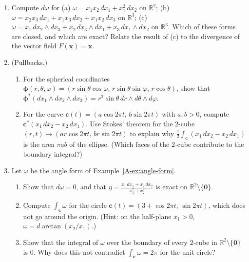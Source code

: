 \begin{enumerate}[leftmargin=*]
\begin{enumerate}[label=(\alph*)]
        \item Write down a basis of $\Lambda^2(\mathbb{R}^4)^*$.
        \item Show that $\varphi \wedge \varphi = 0$ for every $1$-form $\varphi$, but that $\omega = dx_1 \wedge dx_2 + dx_3 \wedge dx_4$ satisfies $\omega \wedge \omega = 2\, dx_1 \wedge dx_2 \wedge dx_3 \wedge dx_4 \neq 0$.
    \end{enumerate}
    \item Compute $d\omega$ for (a) $\omega = x_1x_2\, dx_1 + x_1^2\, dx_2$ on $\mathbb{R}^2$; (b) $\omega = x_2x_3\, dx_1 + x_1x_3\, dx_2 + x_1x_2\, dx_3$ on $\mathbb{R}^3$; (c) $\omega = x_1\, dx_2 \wedge dx_3 + x_2\, dx_3 \wedge dx_1 + x_3\, dx_1 \wedge dx_2$ on $\mathbb{R}^3$. Which of these forms are closed, and which are exact? Relate the result of (c) to the divergence of the vector field $F(\mathbf{x}) = \mathbf{x}$.
    \item (Pullbacks.)
    \begin{enumerate}[label=(\alph*)]
        \item For the spherical coordinates $\boldsymbol{\phi}(r, \theta, \varphi) = (r\sin\theta\cos\varphi, \, r\sin\theta\sin\varphi, \, r\cos\theta)$, show that $\boldsymbol{\phi}^*(dx_1 \wedge dx_2 \wedge dx_3) = r^2\sin\theta\, dr \wedge d\theta \wedge d\varphi$.
        \item For the curve $\mathbf{c}(t) = (a\cos 2\pi t, \, b\sin 2\pi t)$ with $a, b > 0$, compute $\mathbf{c}^*(x_1\, dx_2 - x_2\, dx_1)$. Use Stokes' theorem for the $2$-cube $(r, t) \mapsto (ar\cos 2\pi t, \, br\sin 2\pi t)$ to explain why $\frac{1}{2}\int_{\mathbf{c}} (x_1\, dx_2 - x_2\, dx_1)$ is the area $\pi ab$ of the ellipse. (Which faces of the $2$-cube contribute to the boundary integral?)
    \end{enumerate}
    \item Let $\omega$ be the angle form of Example~\ref{A-ex:angle-form}.
    \begin{enumerate}[label=(\alph*)]
        \item Show that $d\omega = 0$, and that $\eta = \frac{x_1\, dx_1 + x_2\, dx_2}{x_1^2 + x_2^2}$ is exact on $\mathbb{R}^2 \setminus \{\mathbf{0}\}$.
        \item Compute $\int_{\mathbf{c}} \omega$ for the circle $\mathbf{c}(t) = (3 + \cos 2\pi t, \, \sin 2\pi t)$, which does not go around the origin. (Hint: on the half-plane $x_1 > 0$, $\omega = d\arctan(x_2/x_1)$.)
        \item Show that the integral of $\omega$ over the boundary of every $2$-cube in $\mathbb{R}^2 \setminus \{\mathbf{0}\}$ is $0$. Why does this not contradict $\int_{\mathbf{c}} \omega = 2\pi$ for the unit circle?

\end{enumerate}
\end{enumerate}

